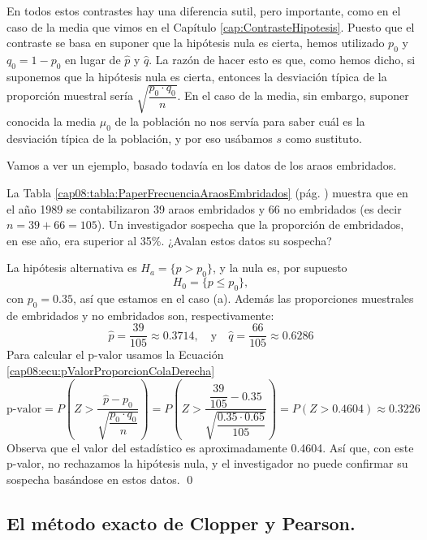 En todos estos contrastes hay una diferencia sutil, pero importante, como en el caso de la media
que vimos en el Capítulo \ref{cap:ContrasteHipotesis}. Puesto que el contraste se basa en suponer
que la hipótesis nula es cierta, hemos utilizado $p_0$ y $q_0=1-p_0$ en lugar de $\hat p$ y $\hat
q$. La razón de hacer esto es que, como hemos dicho, si suponemos que la hipótesis nula es cierta,
entonces la desviación típica de la proporción muestral sería $\sqrt{\dfrac{p_0\cdot q_0}{n}}$. En
el caso de la media, sin embargo, suponer conocida la media $\mu_0$ de la población no nos servía
para saber cuál es la desviación típica de la población, y por eso usábamos $s$ como sustituto.

Vamos a ver un ejemplo, basado todavía en los datos de los araos embridados.
\begin{ejemplo}\label{cap08:ejem:ContrasteHipotesisProporcionAraos}
La Tabla \ref{cap08:tabla:PaperFrecuenciaAraosEmbridados} (pág.
\pageref{cap08:tabla:PaperFrecuenciaAraosEmbridados}) muestra que en el año 1989 se contabilizaron
39 araos embridados y 66 no embridados (es decir $n=39+66=105$). Un investigador sospecha que la
proporción de embridados, en ese año, era superior al 35\%. ¿Avalan estos datos su sospecha?

La hipótesis alternativa es $H_a=\{p>p_0\}$, y la nula es, por supuesto
\[ H_0=\{p\leq p_0\},\]
con $p_0=0.35$, así que estamos en el caso (a). Además las proporciones muestrales de embridados y
no embridados son, respectivamente:
\[\hat p=\dfrac{39}{105}\approx 0.3714,\quad\mbox{y}\quad\hat q=\dfrac{66}{105}\approx 0.6286\]
Para calcular el p-valor usamos la Ecuación \ref{cap08:ecu:pValorProporcionColaDerecha}
        \[
        \mbox{p-valor}=
        P\left(Z > \dfrac{\hat p-p_0}{\sqrt{\dfrac{p_0\cdot q_0}{n}}}\right)=
        P\left(Z > \dfrac{\dfrac{39}{105}-0.35}{\sqrt{\dfrac{0.35\cdot 0.65}{105}}}\right)=
        P\left(Z > 0.4604\right)\approx 0.3226
        \]
Observa que el valor del estadístico es aproximadamente 0.4604. Así que, con este p-valor, no
rechazamos la hipótesis nula, y el investigador no puede confirmar su sospecha basándose en estos
datos. \qed
\end{ejemplo}


\subsection{El método exacto de Clopper y Pearson.}
\label{cap08:subsec:MetodoExactoBinomial}
\\

